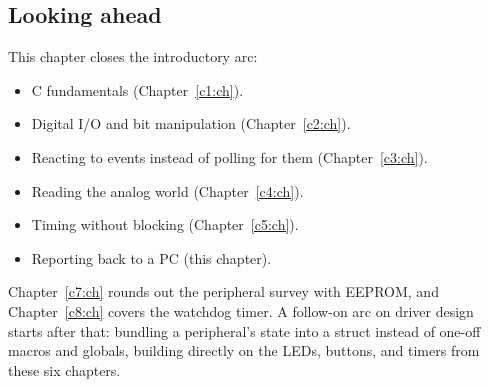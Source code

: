 \subsection*{Looking ahead}
This chapter closes the introductory arc:
\begin{itemize}
  \item C fundamentals (Chapter~\ref{c1:ch}).
  \item Digital I/O and bit manipulation (Chapter~\ref{c2:ch}).
  \item Reacting to events instead of polling for them (Chapter~\ref{c3:ch}).
  \item Reading the analog world (Chapter~\ref{c4:ch}).
  \item Timing without blocking (Chapter~\ref{c5:ch}).
  \item Reporting back to a PC (this chapter).
\end{itemize}
Chapter~\ref{c7:ch} rounds out the peripheral survey with EEPROM, and Chapter~\ref{c8:ch} covers
the watchdog timer. A follow-on arc on driver design starts after that: bundling a peripheral's
state into a struct instead of one-off macros and globals, building directly on the LEDs, buttons,
and timers from these six chapters.
